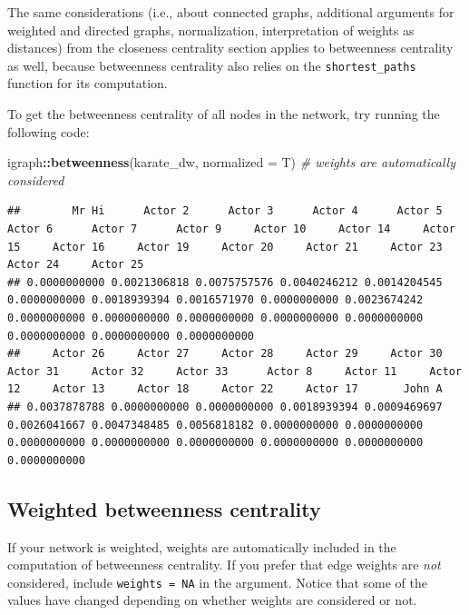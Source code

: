 \documentclass[
]{book}
\newenvironment{Shaded}{\begin{snugshade}}{\end{snugshade}}
\newcommand{\AttributeTok}[1]{\textcolor[rgb]{0.13,0.29,0.53}{#1}}
\newcommand{\CommentTok}[1]{\textcolor[rgb]{0.56,0.35,0.01}{\textit{#1}}}
\newcommand{\FunctionTok}[1]{\textcolor[rgb]{0.13,0.29,0.53}{\textbf{#1}}}
\newcommand{\NormalTok}[1]{#1}
\newcommand{\SpecialCharTok}[1]{\textcolor[rgb]{0.81,0.36,0.00}{\textbf{#1}}}
\begin{document}
The same considerations (i.e., about connected graphs, additional arguments for weighted and directed graphs, normalization, interpretation of weights as distances) from the closeness centrality section applies to betweenness centrality as well, because betweenness centrality also relies on the \texttt{shortest\_paths} function for its computation.

To get the betweenness centrality of all nodes in the network, try running the following code:

\begin{Shaded}
\begin{Highlighting}[]
\NormalTok{igraph}\SpecialCharTok{::}\FunctionTok{betweenness}\NormalTok{(karate\_dw, }\AttributeTok{normalized =}\NormalTok{ T) }\CommentTok{\# weights are automatically considered}
\end{Highlighting}
\end{Shaded}

\begin{verbatim}
##        Mr Hi      Actor 2      Actor 3      Actor 4      Actor 5      Actor 6      Actor 7      Actor 9     Actor 10     Actor 14     Actor 15     Actor 16     Actor 19     Actor 20     Actor 21     Actor 23     Actor 24     Actor 25 
## 0.0000000000 0.0021306818 0.0075757576 0.0040246212 0.0014204545 0.0000000000 0.0018939394 0.0016571970 0.0000000000 0.0023674242 0.0000000000 0.0000000000 0.0000000000 0.0000000000 0.0000000000 0.0000000000 0.0000000000 0.0000000000 
##     Actor 26     Actor 27     Actor 28     Actor 29     Actor 30     Actor 31     Actor 32     Actor 33      Actor 8     Actor 11     Actor 12     Actor 13     Actor 18     Actor 22     Actor 17       John A 
## 0.0037878788 0.0000000000 0.0000000000 0.0018939394 0.0009469697 0.0026041667 0.0047348485 0.0056818182 0.0000000000 0.0000000000 0.0000000000 0.0000000000 0.0000000000 0.0000000000 0.0000000000 0.0000000000
\end{verbatim}

\subsection{Weighted betweenness centrality}\label{weighted-betweenness-centrality}

If your network is weighted, weights are automatically included in the computation of betweenness centrality. If you prefer that edge weights are \emph{not} considered, include \texttt{weights\ =\ NA} in the argument. Notice that some of the values have changed depending on whether weights are considered or not.
\end{document}
